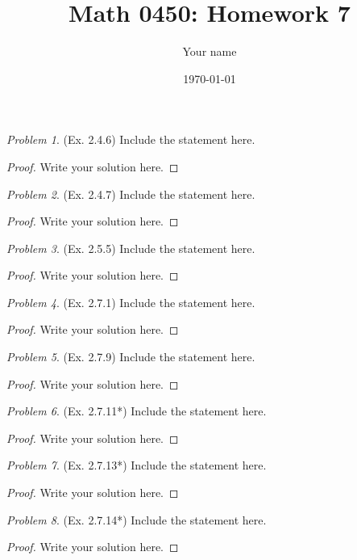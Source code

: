 \documentclass[11pt,twoside, reqno]{amsart}
\theoremstyle{remark}
\newtheorem{Prob}{Problem}
\begin{document}
\title{Math 0450: Homework 7}
\date{\today}
\author{Your name}

\maketitle

\begin{Prob}(Ex. 2.4.6) Include the statement here.


\end{Prob}

\begin{proof}
Write your solution here.

\end{proof}

\begin{Prob}(Ex. 2.4.7)  Include the statement here.


\end{Prob}

\begin{proof}
Write your solution here.

\end{proof}

\begin{Prob}(Ex. 2.5.5)  Include the statement here.
\end{Prob}

\begin{proof}
Write your solution here.

\end{proof}


\begin{Prob}(Ex. 2.7.1)  Include the statement here.
\end{Prob}

\begin{proof}
Write your solution here.

\end{proof}


\begin{Prob}(Ex. 2.7.9)  Include the statement here.
\end{Prob}

\begin{proof}
Write your solution here.

\end{proof}

\begin{Prob}(Ex. 2.7.11*)  Include the statement here.
\end{Prob}

\begin{proof}
Write your solution here.

\end{proof}

\begin{Prob}(Ex. 2.7.13*)  Include the statement here.
\end{Prob}

\begin{proof}
Write your solution here.

\end{proof}

\begin{Prob}(Ex. 2.7.14*)  Include the statement here.
\end{Prob}

\begin{proof}
Write your solution here.

\end{proof}
\end{document}
